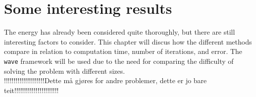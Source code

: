\chapter{Some interesting results}
The energy has already been considered quite thoroughly, but there are still interesting factors to consider. This chapter will discus how the different methods compare in relation to computation time, number of iterations, and error. The \texttt{wave} framework will be used due to the need for comparing the difficulty of solving the problem with different sizes.\\
!!!!!!!!!!!!!!!!!!!!!Dette må gjøres for andre problemer, dette er jo bare teit!!!!!!!!!!!!!!!!!!!!!!!\\


